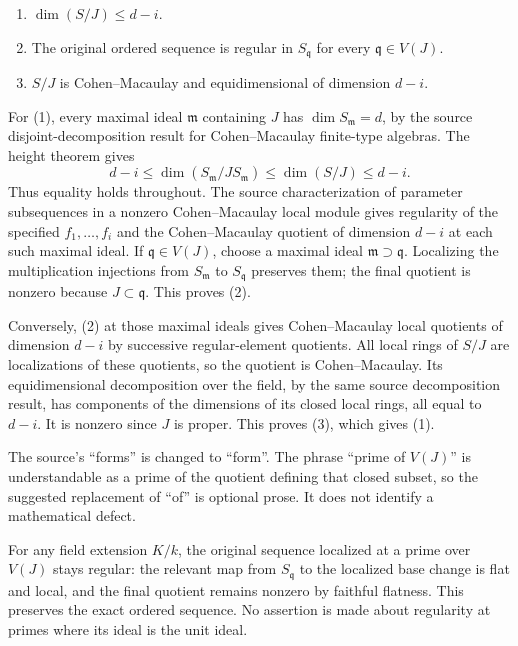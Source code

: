 \begin{enumerate}
\def\labelenumi{\arabic{enumi}.}
\tightlist
\item
  \(\dim(S/J)\leq d-i\).
\item
  The original ordered sequence is regular in \(S_{\mathfrak q}\) for every \(\mathfrak q\in V(J)\).
\item
  \(S/J\) is Cohen--Macaulay and equidimensional of dimension \(d-i\).
\end{enumerate}

For (1), every maximal ideal \(\mathfrak m\) containing \(J\) has \(\dim S_{\mathfrak m}=d\), by the source disjoint-decomposition result for Cohen--Macaulay finite-type algebras. The height theorem gives \[
d-i\leq\dim(S_{\mathfrak m}/JS_{\mathfrak m})\leq\dim(S/J)\leq d-i.
\] Thus equality holds throughout. The source characterization of parameter subsequences in a nonzero Cohen--Macaulay local module gives regularity of the specified \(f_1,\ldots,f_i\) and the Cohen--Macaulay quotient of dimension \(d-i\) at each such maximal ideal. If \(\mathfrak q\in V(J)\), choose a maximal ideal \(\mathfrak m\supset\mathfrak q\). Localizing the multiplication injections from \(S_{\mathfrak m}\) to \(S_{\mathfrak q}\) preserves them; the final quotient is nonzero because \(J\subset\mathfrak q\). This proves (2).

Conversely, (2) at those maximal ideals gives Cohen--Macaulay local quotients of dimension \(d-i\) by successive regular-element quotients. All local rings of \(S/J\) are localizations of these quotients, so the quotient is Cohen--Macaulay. Its equidimensional decomposition over the field, by the same source decomposition result, has components of the dimensions of its closed local rings, all equal to \(d-i\). It is nonzero since \(J\) is proper. This proves (3), which gives (1).

The source's ``forms'' is changed to ``form''. The phrase ``prime of \(V(J)\)'' is understandable as a prime of the quotient defining that closed subset, so the suggested replacement of ``of'' is optional prose. It does not identify a mathematical defect.

For any field extension \(K/k\), the original sequence localized at a prime over \(V(J)\) stays regular: the relevant map from \(S_{\mathfrak q}\) to the localized base change is flat and local, and the final quotient remains nonzero by faithful flatness. This preserves the exact ordered sequence. No assertion is made about regularity at primes where its ideal is the unit ideal.


